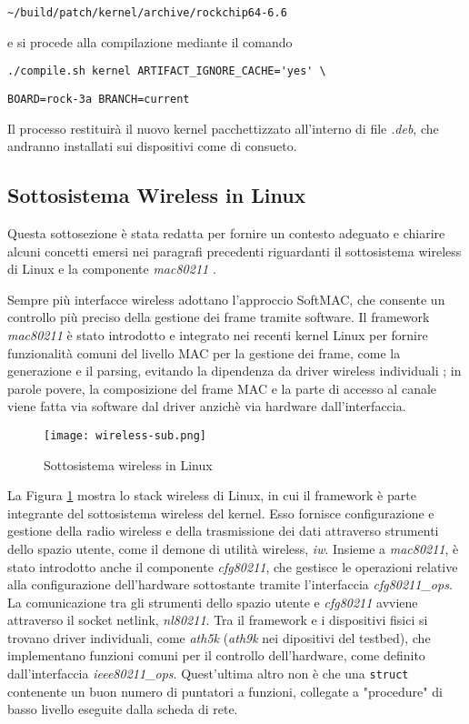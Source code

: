 \verb|~/build/patch/kernel/archive/rockchip64-6.6 |

\noindent e si procede alla compilazione mediante il comando 

\verb|./compile.sh kernel ARTIFACT_IGNORE_CACHE='yes' \| 

\verb|BOARD=rock-3a BRANCH=current|

\noindent Il processo restituirà il nuovo kernel pacchettizzato all'interno di file \textit{.deb}, che andranno installati sui dispositivi come di consueto.

\subsection{Sottosistema Wireless in Linux}
\label{subsystem}
Questa sottosezione è stata redatta per fornire un contesto adeguato e chiarire alcuni concetti emersi nei paragrafi precedenti riguardanti il sottosistema wireless di Linux e la componente \textit{mac80211} \cite{short_walk}.

Sempre più interfacce wireless adottano l'approccio SoftMAC, che consente un controllo più preciso della gestione dei frame tramite software. Il framework \textit{mac80211} è stato introdotto e integrato nei recenti kernel Linux per fornire funzionalità comuni del livello MAC per la gestione dei frame, come la generazione e il parsing, evitando la dipendenza da driver wireless individuali \cite{wireless-profiling}; in parole povere, la composizione del frame MAC e la parte di accesso al canale viene fatta via software dal driver anzichè via hardware dall'interfaccia.

\begin{figure}[h!]
    \centering
    \texttt{[image: wireless-sub.png]}
    \caption{Sottosistema wireless in Linux}
    \label{fig:wireless-sub}
\end{figure}

La Figura \ref{fig:wireless-sub} mostra lo stack wireless di Linux, in cui il framework è parte integrante del sottosistema wireless del kernel. Esso fornisce configurazione e gestione della radio wireless e della trasmissione dei dati attraverso strumenti dello spazio utente, come il demone di utilità wireless, \textit{iw}. Insieme a \textit{mac80211}, è stato introdotto anche il componente \textit{cfg80211}, che gestisce le operazioni relative alla configurazione dell'hardware sottostante tramite l'interfaccia \textit{cfg80211\_ops}. La comunicazione tra gli strumenti dello spazio utente e \textit{cfg80211} avviene attraverso il socket netlink, \textit{nl80211}. Tra il framework e i dispositivi fisici si trovano driver individuali, come \textit{ath5k} (\textit{ath9k} nei dipositivi del testbed), che implementano funzioni comuni per il controllo dell'hardware, come definito dall'interfaccia \textit{ieee80211\_ops}. Quest'ultima altro non è che una \verb|struct| contenente un buon numero di puntatori a funzioni, collegate a "procedure" di basso livello eseguite dalla scheda di rete.

